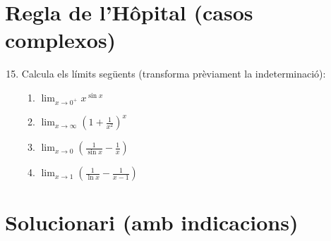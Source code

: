 \documentclass[12pt]{article}
\begin{document}
\section*{Regla de l'Hôpital (casos complexos)}

\begin{enumerate}[label=\arabic*.]
    \setcounter{enumi}{14}
    \item Calcula els límits següents (transforma prèviament la indeterminació):
    \begin{enumerate}[label=\alph*)]
        \item $\displaystyle \lim_{x\to 0^+} x^{\sin x}$
        \item $\displaystyle \lim_{x\to \infty} \left(1+\frac{1}{x^2}\right)^x$
        \item $\displaystyle \lim_{x\to 0} \left(\frac{1}{\sin x} - \frac{1}{x}\right)$
        \item $\displaystyle \lim_{x\to 1} \left(\frac{1}{\ln x} - \frac{1}{x-1}\right)$
    \end{enumerate}
\end{enumerate}

\newpage

\section*{Solucionari (amb indicacions)}
\end{document}
